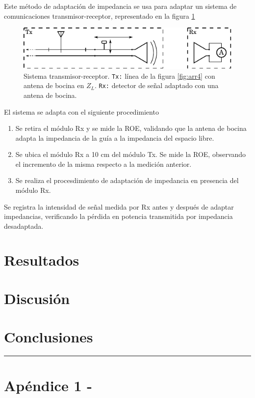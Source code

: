 \documentclass[11pt,a4paper]{article}
\begin{document}
\begin{multicols}{2}
Este método de adaptación de impedancia se usa para adaptar un sistema de comunicaciones transmisor-receptor, representado en la figura \ref{fig:sistema}

\begin{figure}[H]
    \centering
    \includegraphics[width=\linewidth]{Images/sistema.pdf}
    \caption{Sistema transmisor-receptor.
    \texttt{Tx:} línea de la figura \ref{fig:arr4} con antena de bocina en $Z_L$. 
    \texttt{Rx:} detector de señal adaptado con una antena de bocina.}
    \label{fig:sistema}
\end{figure}

El sistema se adapta con el siguiente procedimiento
\begin{enumerate}
    \item Se retira el módulo Rx y se mide la ROE, validando que la antena de bocina adapta la impedancia de la guía a la impedancia del espacio libre.
    \item Se ubica el módulo Rx a 10 cm del módulo Tx. Se mide la ROE, observando el incremento de la misma respecto a la medición anterior.
    \item Se realiza el procesdimiento de adaptación de impedancia en presencia del módulo Rx.
\end{enumerate}

Se registra la intensidad de señal medida por Rx antes y después de adaptar impedancias, verificando la pérdida en potencia transmitida por impedancia desadaptada.

\section{Resultados}


\section{Discusión}

\section{Conclusiones}




\end{multicols}
\newpage
\begin{appendices}
\vspace{-1em}
\hrule
\vspace{1em}
\normalsize
\section{Apéndice 1 -}
\end{appendices}

\begin{multicols}{2}

\end{multicols}
\end{document}
